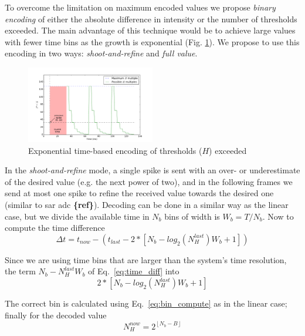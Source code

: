 \documentclass[twocolumn]{article}
\begin{document}
To overcome the limitation on maximum encoded values  we propose \textit{binary encoding} of either the absolute difference in intensity or the number of thresholds exceeded. The main advantage of this technique would be to achieve large values with fewer time bins as the growth is exponential (Fig. \ref{fig:exponential_time}). We propose to use this encoding in two ways: \textit{shoot-and-refine} and \textit{full value}. 

\begin{figure}[htb]
  \includegraphics[width=0.5\textwidth]{spike_values_exp}

  \caption{Exponential time-based encoding of thresholds ($H$) exceeded}
  \label{fig:exponential_time}
\end{figure} 

In the \textit{shoot-and-refine} mode, a single spike is sent with an over- or underestimate of the desired value (e.g. the next power of two), and in the following frames we send at most one spike to refine the received value towards the desired one (similar to sar adc \textbf{\{ref\}}). Decoding can be done in a similar way as the linear case, but we divide the available time in $N_{b}$ bins of width is $W_{b} = T/N_{b}$. Now to compute the time difference
\begin{equation}
\Delta t = t_{now} - \left( t_{last} - 2*\left[N_{b} - log_{2}(N_{H}^{last})W_{b} + 1\right] \right)
\label{eq:time_diff_exp}
\end{equation}

Since we are using time bins that are larger than the system's time resolution, the term $N_{b} - N_{H}^{last}W_{b}$ of Eq.~\ref{eq:time_diff} into
\begin{equation}
 2*\left[N_{b} - log_{2}(N_{H}^{last})W_{b} + 1\right]
\end{equation}

The correct bin is calculated using Eq.~\ref{eq:bin_compute} as in the linear case; finally for the decoded value
\begin{equation}
N_{H}^{now} = 2^{ \left\lfloor N_{b} - B \right\rfloor }
\label{eq:new_Nh_exp}
\end{equation}
\end{document}
